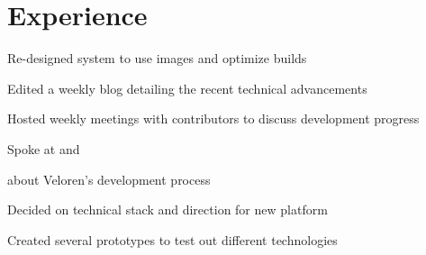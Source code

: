 \documentclass[]{deedy-resume-openfont}
\begin{document}
\begin{minipage}[t]{0.66\textwidth}


\section{Experience}

\begin{tightemize}

\item Re-designed system to use images and optimize builds

\item Edited a weekly blog detailing the recent technical advancements

\item Hosted weekly meetings with contributors to discuss development progress

\item Spoke at \href{https://www.youtube.com/watch?v=aS26sqT09Pw}{}\href{https://www.youtube.com/watch?v=76FPpOnshNw}{}and 

\item \href{https://www.gamingonlinux.com/2020/06/interviewed-veloren-an-upcoming-foss-multiplayer-voxel-rpg}{}about Veloren's development process

\end{tightemize}
\sectionsep
{}
\begin{tightemize}

\item Decided on technical stack and direction for new platform

\item Created several prototypes to test out different technologies

\end{tightemize}
\sectionsep
{}
\begin{tightemize}


\end{tightemize}
\end{minipage}
\end{document}
